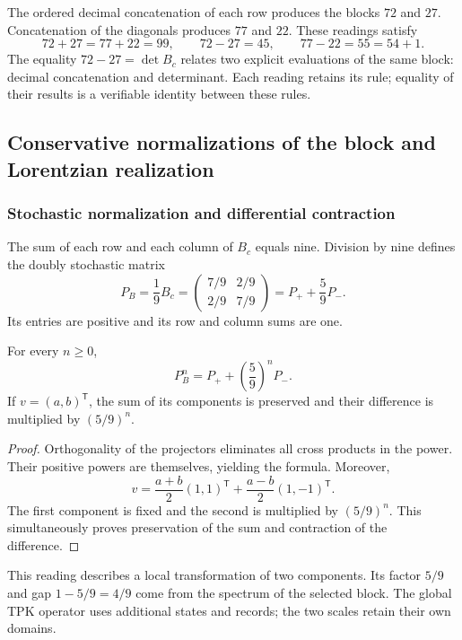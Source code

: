 The ordered decimal concatenation of each row produces the blocks $72$ and $27$. Concatenation of the diagonals produces $77$ and $22$. These readings satisfy
\[
 72+27=77+22=99,
 \qquad72-27=45,
 \qquad77-22=55=54+1.
\]
The equality $72-27=\det B_c$ relates two explicit evaluations of the same block: decimal concatenation and determinant. Each reading retains its rule; equality of their results is a verifiable identity between these rules.

\subsection{Conservative normalizations of the block and Lorentzian realization}
\label{geo:lorentz}

\subsubsection{Stochastic normalization and differential contraction}

The sum of each row and each column of $B_c$ equals nine. Division by nine defines the doubly stochastic matrix
\[
 P_B=\frac19B_c
 =\begin{pmatrix}7/9&2/9\\2/9&7/9\end{pmatrix}
 =P_++\frac59P_-.
\]
Its entries are positive and its row and column sums are one.

\begin{proposicion}
\label{geo:prop-markov}
For every $n\geq0$,
\[
 P_B^n=P_++\left(\frac59\right)^nP_-.
\]
If $v=(a,b)^{\mathsf T}$, the sum of its components is preserved and their difference is multiplied by $(5/9)^n$.
\end{proposicion}

\begin{proof}
Orthogonality of the projectors eliminates all cross products in the power. Their positive powers are themselves, yielding the formula. Moreover,
\[
 v=\frac{a+b}{2}(1,1)^{\mathsf T}
   +\frac{a-b}{2}(1,-1)^{\mathsf T}.
\]
The first component is fixed and the second is multiplied by $(5/9)^n$. This simultaneously proves preservation of the sum and contraction of the difference.
\end{proof}

This reading describes a local transformation of two components. Its factor $5/9$ and gap $1-5/9=4/9$ come from the spectrum of the selected block. The global TPK operator uses additional states and records; the two scales retain their own domains.

